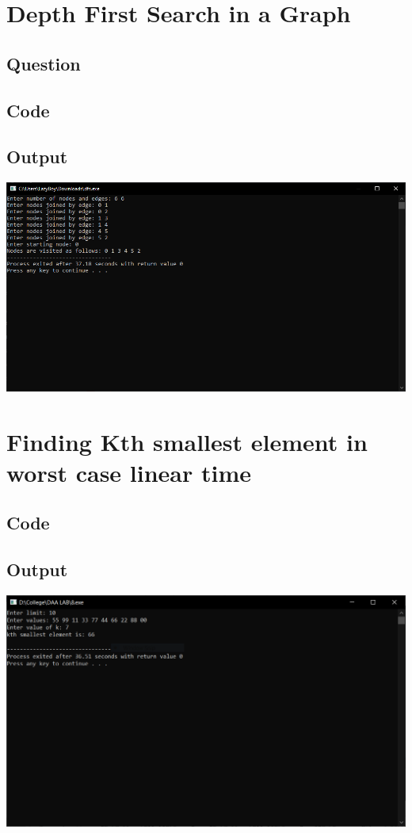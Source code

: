 \documentclass[11pt]{article}
\begin{document}
\section{Depth First Search in a Graph}
	\subsection{Question}
	\subsection{Code}
		
	\subsection{Output}
		\includegraphics[scale=0.7]{pic/7.png}
\newpage









\section{Finding Kth smallest element in worst case linear time}
	\subsection{Code}
		
	\subsection{Output}
		\includegraphics[scale=0.7]{pic/8.png}
\newpage
\end{document}
